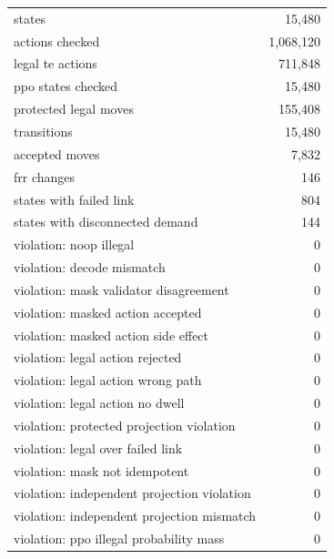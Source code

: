 \begin{center}\small\begin{tabular}{@{}lr@{}}\toprule
states & 15,480 \\
actions checked & 1,068,120 \\
legal te actions & 711,848 \\
ppo states checked & 15,480 \\
protected legal moves & 155,408 \\
transitions & 15,480 \\
accepted moves & 7,832 \\
frr changes & 146 \\
states with failed link & 804 \\
states with disconnected demand & 144 \\
\midrule
violation: noop illegal & 0 \\
violation: decode mismatch & 0 \\
violation: mask validator disagreement & 0 \\
violation: masked action accepted & 0 \\
violation: masked action side effect & 0 \\
violation: legal action rejected & 0 \\
violation: legal action wrong path & 0 \\
violation: legal action no dwell & 0 \\
violation: protected projection violation & 0 \\
violation: legal over failed link & 0 \\
violation: mask not idempotent & 0 \\
violation: independent projection violation & 0 \\
violation: independent projection mismatch & 0 \\
violation: ppo illegal probability mass & 0 \\
\bottomrule\end{tabular}\end{center}
